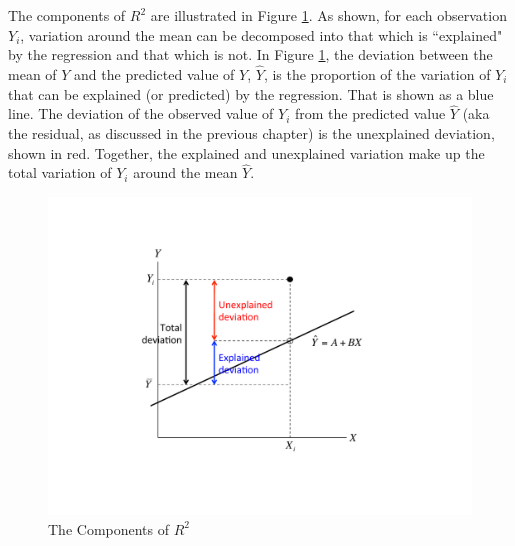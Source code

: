 \documentclass[11pt,openany]{book}\usepackage[]{graphicx}\usepackage[]{color}
\begin{document}
{The components of $R^{2}$ are illustrated in Figure \ref{fig:rsquared}. As shown, for each observation $Y_{i}$, variation around the mean can be decomposed into that which is ``explained" by the regression and that which is not. In Figure \ref{fig:rsquared}, the deviation between the mean of $Y$ and the predicted value of $Y$, $\hat{Y}$, is the proportion of the variation of  $Y_{i}$ that can be explained (or predicted) by the regression. That is shown as a blue line. The deviation of the observed value of $Y_{i}$ from the predicted value $\hat{Y}$ (aka the residual, as discussed in the previous chapter) is the unexplained deviation, shown in red. Together, the explained and unexplained variation make up the total variation of  $Y_{i}$ around the mean $\hat{Y}$.

\begin{figure}
  \centering
  \includegraphics[width=5in]{09_InterpretSimple/rsquared.pdf}%
  \caption{The Components of $R^{2}$ \label{fig:rsquared}}
\end{figure}

}
\end{document}
